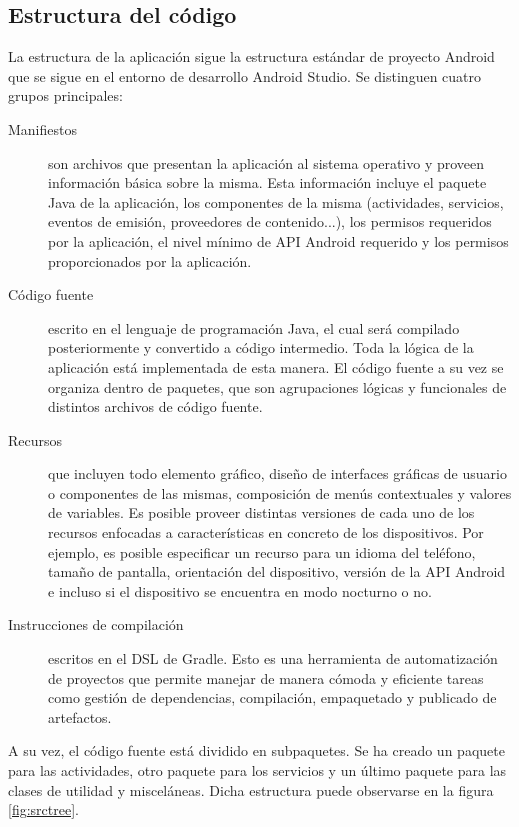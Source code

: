\FloatBarrier
\subsection{Estructura del código}
\label{sec:estructura}
La estructura de la aplicación sigue la estructura estándar de proyecto Android que se sigue en el entorno de desarrollo Android Studio. Se distinguen cuatro grupos principales:
\begin{description}
	
\item[Manifiestos] son archivos que presentan la aplicación al sistema operativo y proveen información básica sobre la misma. Esta información incluye el paquete Java de la aplicación, los componentes de la misma (actividades, servicios, eventos de emisión, proveedores de contenido...), los permisos requeridos por la aplicación, el nivel mínimo de \ac{API} Android requerido y los permisos proporcionados por la aplicación.

\item[Código fuente] escrito en el lenguaje de programación Java, el cual será compilado posteriormente y convertido a código intermedio. Toda la lógica de la aplicación está implementada de esta manera. El código fuente a su vez se organiza dentro de paquetes, que son agrupaciones lógicas y funcionales de distintos archivos de código fuente.

\item[Recursos] que incluyen todo elemento gráfico, diseño de interfaces gráficas de usuario o componentes de las mismas, composición de menús contextuales y valores de variables. Es posible proveer distintas versiones de cada uno de los recursos enfocadas a características en concreto de los dispositivos. Por ejemplo, es posible especificar un recurso para un idioma del teléfono, tamaño de pantalla, orientación del dispositivo, versión de la API Android e incluso si el dispositivo se encuentra en modo nocturno o no.

\item[Instrucciones de compilación] escritos en el \ac{DSL} de Gradle. Esto es una herramienta de automatización de proyectos que permite manejar de manera cómoda y eficiente tareas como gestión de dependencias, compilación, empaquetado y publicado de artefactos.
\end{description}
 
 A su vez, el código fuente está dividido en subpaquetes. Se ha creado un paquete para las actividades, otro paquete para los servicios y un último paquete para las clases de utilidad y misceláneas. Dicha estructura puede observarse en la figura \ref{fig:srctree}.
 
